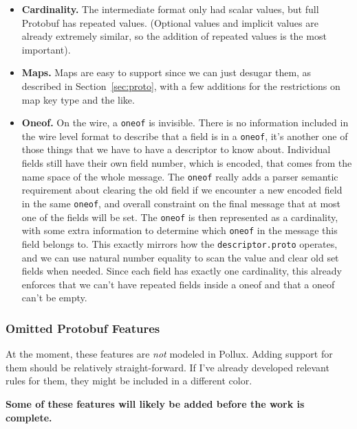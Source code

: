 \begin{itemize}
\item \textbf{Cardinality.} The intermediate format only had scalar values, but
  full Protobuf has repeated values. (Optional values and implicit values are
  already extremely similar, so the addition of repeated values is the most
  important). 
\item \textbf{Maps.} Maps are easy to support since we can just desugar them, as
  described in Section~\ref{sec:proto}, with a few additions for the
  restrictions on map key type and the like.
\item \textbf{Oneof.} On the wire, a \texttt{oneof} is invisible. There is no
  information included in the wire level format to describe that a field is in a
  \texttt{oneof}, it's another one of those things that we have to have a
  descriptor to know about. Individual fields still have their own field number,
  which is encoded, that comes from the name space of the whole message. The
  \texttt{oneof} really adds a parser semantic requirement about clearing the
  old field if we encounter a new encoded field in the same \texttt{oneof}, and
  overall constraint on the final message that at most one of the fields will be
  set. The \texttt{oneof} is then represented as a cardinality, with some extra
  information to determine which \texttt{oneof} in the message this field
  belongs to. This exactly mirrors how the \texttt{descriptor.proto} operates,
  and we can use natural number equality to scan the value and clear old set
  fields when needed. Since each field has exactly one cardinality, this already
  enforces that we can't have repeated fields inside a oneof and that a oneof
  can't be empty.
\end{itemize}

\subsubsection{Omitted Protobuf Features}

At the moment, these features are \emph{not} modeled in Pollux. Adding support
for them should be relatively straight-forward. If I've already developed
relevant rules for them, they might be included in a different color.

\textbf{Some of these features will likely be added before the work is complete.}

